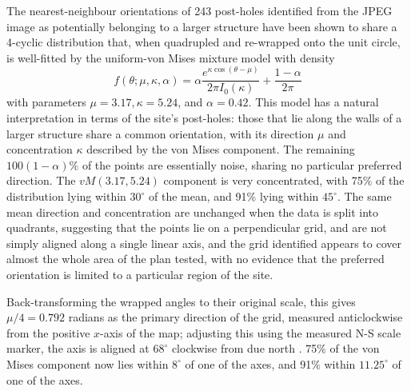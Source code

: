 \documentclass[../../ArchStats.tex]{subfiles}
\begin{document}

The nearest-neighbour orientations of 243 post-holes identified from the JPEG image as potentially belonging to a larger structure have been shown to share a 4-cyclic distribution that, when quadrupled and re-wrapped onto the unit circle, is well-fitted by the uniform-von Mises mixture model with density
\begin{equation}
f(\theta; \mu, \kappa, \alpha) = \alpha \frac{e^{\kappa \cos(\theta - \mu)}}{2\pi I_0(\kappa)} + \frac{1-\alpha}{2\pi}
\end{equation}
with parameters $\mu = 3.17, \kappa = 5.24$, and $\alpha =  0.42$. This model has a natural interpretation in terms of the site's post-holes: those that lie along the walls of a larger structure share a common orientation, with its direction $\mu$ and concentration $\kappa$ described by the von Mises component. The remaining $100(1-\alpha)\%$ of the points are essentially noise, sharing no particular preferred direction. The $vM(3.17, 5.24)$ component is very concentrated, with 75\% of the distribution lying within $30^\circ$ of the mean, and 91\% lying within $45^\circ$. The same mean direction and  concentration are unchanged when the data is split into quadrants, suggesting that the points lie on a perpendicular grid, and are not simply aligned along a single linear axis, and the grid identified appears to cover almost the whole area of the plan tested, with no evidence that the preferred orientation is limited to a particular region of the site.

Back-transforming the wrapped angles to their original scale, this gives $\mu/4 = 0.792$ radians as the primary direction of the grid, measured anticlockwise from the positive $x$-axis of the map; adjusting this using the measured N-S scale marker, the axis is aligned at $68^\circ$ clockwise from due north . 75\% of the von Mises component now lies within $8^\circ$ of one of the axes, and 91\% within $11.25^\circ$ of one of the axes.


\end{document}
